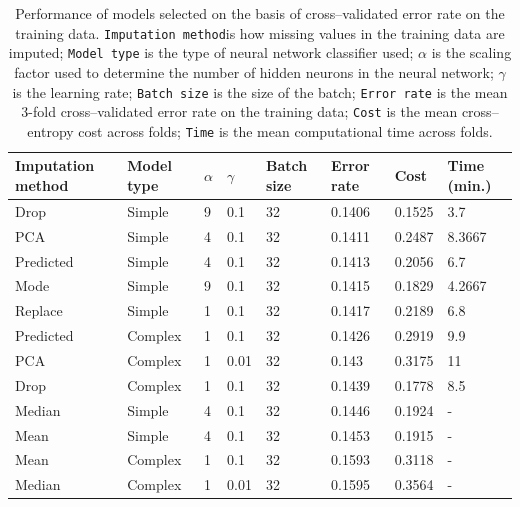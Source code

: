 \documentclass[10pt,twocolumn,letterpaper]{article}
\begin{document}
\begin{table}[htbp]
\begin{center}
\begin{tabular}{llllllll}
\textbf{Imputation method} & \textbf{Model type} & \textbf{$\alpha$} & \textbf{$\gamma$} & \textbf{Batch size} & \textbf{Error rate} & \textbf{Cost} & \textbf{Time (min.)} \\
\hline
Drop & Simple & 9 & 0.1 & 32 & 0.1406 & 0.1525 & 3.7 \\
PCA & Simple & 4 & 0.1 & 32 & 0.1411 & 0.2487 & 8.3667 \\
Predicted & Simple & 4 & 0.1 & 32 & 0.1413 & 0.2056 & 6.7 \\
Mode & Simple & 9 & 0.1 & 32 & 0.1415 & 0.1829 & 4.2667 \\
Replace & Simple & 1 & 0.1 & 32 & 0.1417 & 0.2189 & 6.8 \\
Predicted & Complex & 1 & 0.1 & 32 & 0.1426 & 0.2919 & 9.9 \\
PCA & Complex & 1 & 0.01 & 32 & 0.143 & 0.3175 & 11 \\
Drop & Complex & 1 & 0.1 & 32 & 0.1439 & 0.1778 & 8.5 \\
Median & Simple & 4 & 0.1 & 32 & 0.1446 & 0.1924 & - \\
Mean & Simple & 4 & 0.1 & 32 & 0.1453 & 0.1915 & - \\
Mean & Complex & 1 & 0.1 & 32 & 0.1593 & 0.3118 & - \\
Median & Complex & 1 & 0.01 & 32 & 0.1595 & 0.3564 & - \\
\hline
\end{tabular}
\end{center}
\caption{Performance of models selected on the basis of cross--validated error rate on the training data. \texttt{Imputation method}is how missing values in the training data are imputed; \texttt{Model type} is the type of neural network classifier used; \texttt{$\alpha$} is the scaling factor used to determine the number of hidden neurons in the neural network; \texttt{$\gamma$} is the learning rate; \texttt{Batch size} is the size of the batch; \texttt{Error rate} is the mean 3-fold cross--validated error rate on the training data;  \texttt{Cost} is the mean cross--entropy cost across folds; \texttt{Time} is the mean computational time across folds. }
\label{tab:err-rates}
\end{table}
\end{document}
